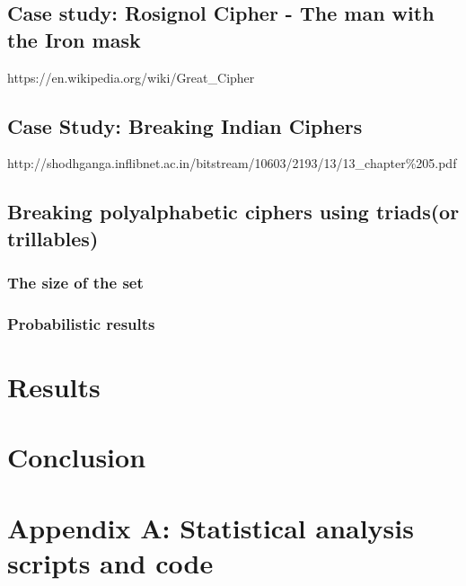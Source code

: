 \documentclass[pdftex,12pt,letter]{article}
\begin{document}
\subsection{Case study: Rosignol Cipher - The man with the Iron mask}
https://en.wikipedia.org/wiki/Great\_Cipher

\subsection{Case Study: Breaking Indian Ciphers}
http://shodhganga.inflibnet.ac.in/bitstream/10603/2193/13/13\_chapter\%205.pdf

\subsection{Breaking polyalphabetic ciphers using triads(or trillables)}

\subsubsection{The size of the set}

\subsubsection{Probabilistic results}

\section{Results}

\section{Conclusion}

\newpage
\appendix{}
\section*{Appendix A: Statistical analysis scripts and code}
\end{document}
